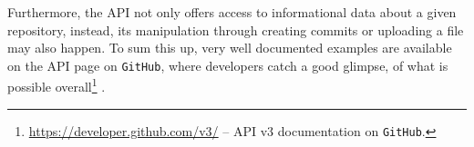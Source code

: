 Furthermore, the API not only offers access to informational data about a given repository, instead, its manipulation through creating commits or uploading a file may also happen. To sum this up, very well documented examples are available on the API page on \texttt{GitHub}, where developers catch a good glimpse, of what is possible overall\footnote{\url{https://developer.github.com/v3/} -- API v3 documentation on \texttt{GitHub}.} \cite[401]{loeliger2012version}.
